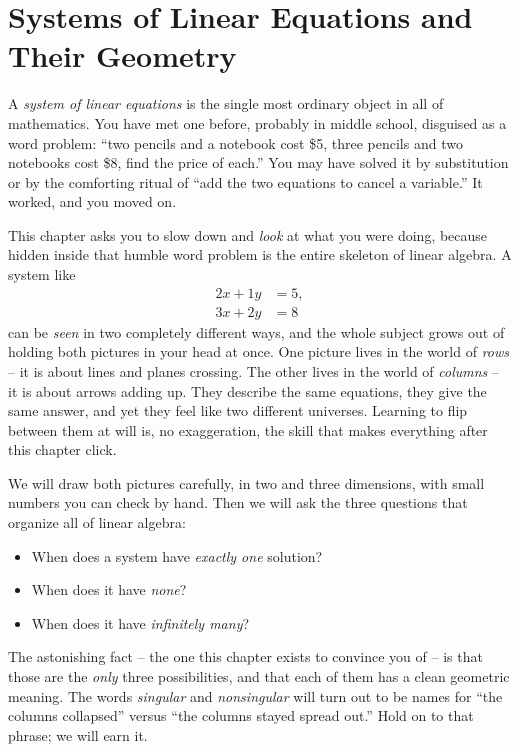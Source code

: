 \chapter{Systems of Linear Equations and Their Geometry}

A \emph{system of linear equations} is the single most ordinary object in
all of mathematics. You have met one before, probably in middle school,
disguised as a word problem: ``two pencils and a notebook cost \$5, three
pencils and two notebooks cost \$8, find the price of each.'' You may have
solved it by substitution or by the comforting ritual of ``add the two
equations to cancel a variable.'' It worked, and you moved on.

This chapter asks you to slow down and \emph{look} at what you were doing,
because hidden inside that humble word problem is the entire skeleton of
linear algebra. A system like
\[
  \begin{aligned}
    2x + 1y &= 5,\\
    3x + 2y &= 8
  \end{aligned}
\]
can be \emph{seen} in two completely different ways, and the whole subject
grows out of holding both pictures in your head at once. One picture lives
in the world of \emph{rows} -- it is about lines and planes crossing. The
other lives in the world of \emph{columns} -- it is about arrows adding up.
They describe the same equations, they give the same answer, and yet they
feel like two different universes. Learning to flip between them at will is,
no exaggeration, the skill that makes everything after this chapter click.

We will draw both pictures carefully, in two and three dimensions, with
small numbers you can check by hand. Then we will ask the three questions
that organize all of linear algebra:
\begin{itemize}
  \item When does a system have \emph{exactly one} solution?
  \item When does it have \emph{none}?
  \item When does it have \emph{infinitely many}?
\end{itemize}
The astonishing fact -- the one this chapter exists to convince you of -- is
that those are the \emph{only} three possibilities, and that each of them
has a clean geometric meaning. The words \emph{singular} and
\emph{nonsingular} will turn out to be names for ``the columns collapsed''
versus ``the columns stayed spread out.'' Hold on to that phrase; we will
earn it.


